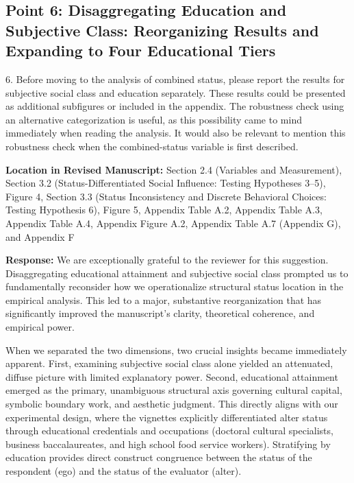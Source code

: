 \documentclass[11pt, letterpaper]{article}
\begin{document}
\vspace{10pt}

\subsection*{Point 6: Disaggregating Education and Subjective Class: Reorganizing Results and Expanding to Four Educational Tiers}

\begin{reviewercomment}
6. Before moving to the analysis of combined status, please report the results for subjective social class and education separately. These results could be presented as additional subfigures or included in the appendix. The robustness check using an alternative categorization is useful, as this possibility came to mind immediately when reading the analysis. It would also be relevant to mention this robustness check when the combined-status variable is first described.
\end{reviewercomment}

\textbf{Location in Revised Manuscript:} Section 2.4 (Variables and Measurement), Section 3.2 (Status-Differentiated Social Influence: Testing Hypotheses 3--5), Figure 4, Section 3.3 (Status Inconsistency and Discrete Behavioral Choices: Testing Hypothesis 6), Figure 5, Appendix Table A.2, Appendix Table A.3, Appendix Table A.4, Appendix Figure A.2, Appendix Table A.7 (Appendix G), and Appendix F

\textbf{Response:}
We are exceptionally grateful to the reviewer for this suggestion. Disaggregating educational attainment and subjective social class prompted us to fundamentally reconsider how we operationalize structural status location in the empirical analysis. This led to a major, substantive reorganization that has significantly improved the manuscript's clarity, theoretical coherence, and empirical power.

When we separated the two dimensions, two crucial insights became immediately apparent. First, examining subjective social class alone yielded an attenuated, diffuse picture with limited explanatory power. Second, educational attainment emerged as the primary, unambiguous structural axis governing cultural capital, symbolic boundary work, and aesthetic judgment. This directly aligns with our experimental design, where the vignettes explicitly differentiated alter status through educational credentials and occupations (doctoral cultural specialists, business baccalaureates, and high school food service workers). Stratifying by education provides direct construct congruence between the status of the respondent (ego) and the status of the evaluator (alter).
\end{document}
